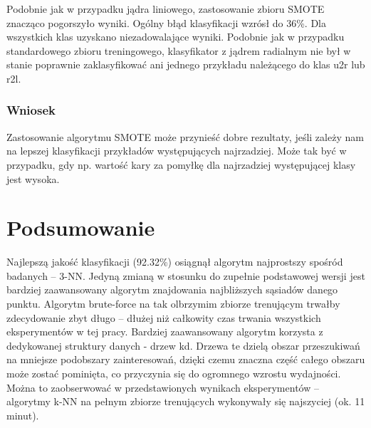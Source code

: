\documentclass[a4paper, 12pt]{article}
\begin{document}
Podobnie jak w przypadku jądra liniowego, zastosowanie zbioru SMOTE znacząco pogorszyło wyniki. Ogólny błąd klasyfikacji wzrósł do 36\%. Dla wszystkich klas uzyskano niezadowalające wyniki. Podobnie jak w przypadku standardowego zbioru treningowego, klasyfikator z jądrem radialnym nie był w stanie poprawnie zaklasyfikować ani jednego przykładu należącego do klas u2r lub r2l.

\subsubsection{Wniosek}

Zastosowanie algorytmu SMOTE może przynieść dobre rezultaty, 
jeśli zależy nam na lepszej klasyfikacji przykładów występujących najrzadziej.
Może tak być w przypadku, gdy np. wartość kary za pomyłkę dla najrzadziej występującej klasy
jest wysoka.

\section{Podsumowanie}

Najlepszą jakość klasyfikacji (92.32\%) osiągnął algorytm najprostszy spośród badanych -- 3-NN.
Jedyną zmianą w stosunku do zupełnie podstawowej wersji jest bardziej zaawansowany algorytm
znajdowania najbliższych sąsiadów danego punktu. Algorytm brute-force na tak olbrzymim zbiorze
trenującym trwałby zdecydowanie zbyt długo -- dłużej niż całkowity czas trwania wszystkich 
eksperymentów w tej pracy. Bardziej zaawansowany algorytm korzysta z dedykowanej struktury
danych - drzew kd. Drzewa te dzielą obszar przeszukiwań na mniejsze podobszary zainteresowań, dzięki 
czemu znaczna część całego obszaru może zostać pominięta, 
co przyczynia się do ogromnego wzrostu wydajności. Można to zaobserwować w przedstawionych
wynikach eksperymentów -- algorytmy
k-NN na pełnym zbiorze trenujących wykonywały się najszyciej (ok. 11 minut).
\end{document}
